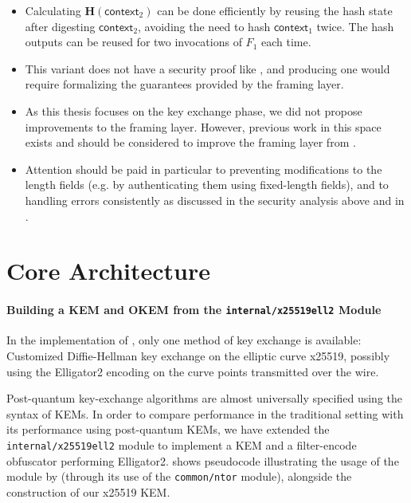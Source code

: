 \begin{itemize}
    \item Calculating $\mathbf{H}(\mathsf{context}_2)$ can be done efficiently by reusing the hash state after digesting $\mathsf{context}_2$, avoiding the need to hash $\mathsf{context}_1$ twice. The hash outputs can be reused for two invocations of $F_1$ each time.
    
    \item This variant does not have a security proof like \drivel{}, and producing one would require formalizing the guarantees provided by the framing layer.

    \item As this thesis focuses on the key exchange phase, we did not propose improvements to the framing layer. However, previous work in this space exists \cite{Fenske2024} and should be considered to improve the framing layer from \obfsfour{}.

    \item Attention should be paid in particular to preventing modifications to the length fields (e.g. by authenticating them using fixed-length fields), and to handling errors consistently as discussed in the security analysis above and in \cite[Section~3.3]{Fenske2024}.

\end{itemize}

\section{Core Architecture} \label{sec:impl-architecture}

\paragraph{Building a KEM and OKEM from the \texttt{internal/x25519ell2} Module}

In the implementation of \obfsfour{}, only one method of key exchange is available: Customized Diffie-Hellman key exchange on the elliptic curve x25519, possibly using the \textsf{Elligator2} encoding on the curve points transmitted over the wire.

Post-quantum key-exchange algorithms are almost universally specified using the syntax of KEMs. In order to compare \drivel{} performance in the traditional setting with its performance using post-quantum KEMs, we have extended the \texttt{internal/x25519ell2} module to implement a KEM and a filter-encode obfuscator performing \textsf{Elligator2}.  shows pseudocode illustrating the usage of the module by \obfsfour{} (through its use of the \texttt{common/ntor} module), alongside the construction of our x25519 KEM.

